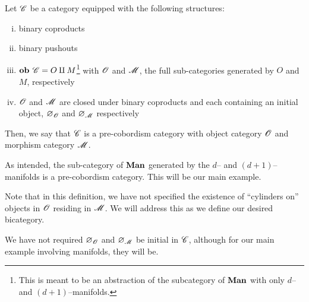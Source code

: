 \documentclass[./Thick_TQFTs_and_Quantum_Information.tex]{subfiles}
\begin{document}
\begin{defn}
Let $\mathscr{C}$ be a category equipped with the following structures:
\begin{enumerate}[(i)]
\setlength{\itemsep}{0pt}
\item binary coproducts
\item binary pushouts
\item $\textbf{ob } \mathscr{C} = O \amalg M$\footnote{This is meant to be an abstraction of
the subcategory of $\textbf{Man}$ with only $d$-- and $(d + 1)$--manifolds.} with
$\mathscr{O}$ and $\mathscr{M}$, the full sub-categories generated by $O$ and $M$,
respectively
\item $\mathscr{O}$ and $\mathscr{M}$ are closed under binary coproducts and each containing
an initial object, $\varnothing_{\mathscr{O}}$ and $\varnothing_{\mathscr{M}}$ respectively
\end{enumerate}
Then, we say that $\mathscr{C}$ is a pre-cobordism category with object category
$\mathscr{O}$ and morphism category $\mathscr{M}$.
\end{defn}

\begin{exm}
As intended, the sub-category of $\textbf{Man}$ generated by the $d$-- and
$(d + 1)$--manifolds is a pre-cobordism category. This will be our main example.
\end{exm}

\begin{rmk}
Note that in this definition, we have not specified the existence of
``cylinders on'' objects in $\mathscr{O}$ residing in $\mathscr{M}$. We will address this as
we define our desired bicategory.
\end{rmk}

\begin{rmk}
We have not required $\varnothing_{\mathscr{O}}$ and $\varnothing_{\mathscr{M}}$ be initial
in $\mathscr{C}$, although for our main example involving manifolds, they will be.
\end{rmk}
\end{document}
